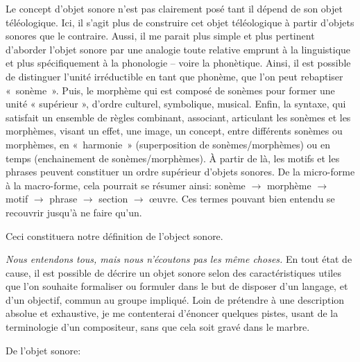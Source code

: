 \documentclass{article}
\begin{document}
Le concept d'objet sonore n'est pas clairement posé tant il dépend de son objet téléologique. Ici, il s'agit plus de construire cet objet téléologique à partir d'objets sonores que le contraire.   
Aussi, il me parait plus simple et plus pertinent d'aborder l'objet sonore par une analogie toute relative emprunt à la linguistique et plus spécifiquement à la phonologie -- voire la phonètique. Ainsi, il est possible de distinguer l'unité irréductible en tant que phonème, que l'on peut rebaptiser \hbox{« sonème »}. Puis, le morphème qui est composé de sonèmes pour former une unité « supérieur », d'ordre culturel, symbolique, musical. Enfin, la syntaxe, qui satisfait un ensemble de règles combinant, associant, articulant les sonèmes et les morphèmes, visant un effet, une image, un concept, entre différents sonèmes ou morphèmes, en \hbox{« harmonie »} (superposition de sonèmes/morphèmes) ou en temps (enchainement de sonèmes/morphèmes). À partir de là, les motifs et les phrases peuvent constituer un ordre supérieur d'objets sonores. De la micro-forme à la macro-forme, cela pourrait se résumer ainsi:
sonème $\rightarrow$ morphème $\rightarrow$ motif $\rightarrow$ phrase $\rightarrow$ section $\rightarrow$ œuvre. Ces termes pouvant bien entendu se recouvrir jusqu'à ne faire qu'un.

Ceci constituera notre définition de l'object sonore.
\bigskip

\textit
{Nous entendons tous, mais nous n'écoutons pas les même choses.}
En tout état de cause, il est possible de décrire un objet sonore selon des caractéristiques utiles que l'on souhaite formaliser ou formuler dans le but de disposer d'un langage, et d'un objectif, commun au groupe impliqué. Loin de prétendre à une description absolue et exhaustive, je me contenterai d'énoncer quelques pistes, usant de la terminologie d'un compositeur, sans que cela soit gravé dans le marbre. 
\bigskip

De l'objet sonore:
\end{document}
